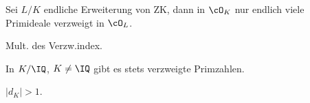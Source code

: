\renewcommand{\lecdate}{16.12.2014}

  \begin{Folgerung}
   Sei $L/K$ endliche Erweiterung von ZK, dann in $\cO_K$ nur endlich viele Primideale verzweigt in $\cO_L$.
  \end{Folgerung}

  \begin{Beweis}
   Mult. des Verzw.index.
  \end{Beweis}

  \begin{Folgerung}
   In $K/\IQ$, $K\neq \IQ$ gibt es stets verzweigte Primzahlen.
  \end{Folgerung}
  
  \begin{Beweis}
   $|d_K|>1$.
  \end{Beweis}
  
